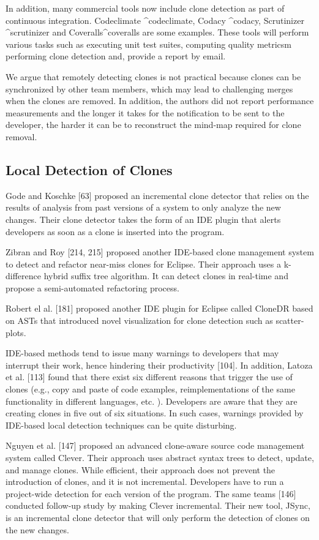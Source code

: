 \documentclass[12pt]{report}
\begin{document}
In addition, many commercial tools now include clone detection as part
of continuous integration. Codeclimate \^{}codeclimate, Codacy
\^{}codacy, Scrutinizer \^{}scrutinizer and Coveralls\^{}coveralls are
some examples. These tools will perform various tasks such as executing
unit test suites, computing quality metricsm performing clone detection
and, provide a report by email.

We argue that remotely detecting clones is not practical because clones
can be synchronized by other team members, which may lead to challenging
merges when the clones are removed. In addition, the authors did not
report performance measurements and the longer it takes for the
notification to be sent to the developer, the harder it can be to
reconstruct the mind-map required for clone removal.

\subsection{Local Detection of Clones}\label{local-detection-of-clones}

Gode and Koschke {[}63{]} proposed an incremental clone detector that
relies on the results of analysis from past versions of a system to only
analyze the new changes. Their clone detector takes the form of an IDE
plugin that alerts developers as soon as a clone is inserted into the
program.

Zibran and Roy {[}214, 215{]} proposed another IDE-based clone
management system to detect and refactor near-miss clones for Eclipse.
Their approach uses a k-difference hybrid suffix tree algorithm. It can
detect clones in real-time and propose a semi-automated refactoring
process.

Robert el al. {[}181{]} proposed another IDE plugin for Eclipse called
CloneDR based on ASTs that introduced novel visualization for clone
detection such as scatter-plots.

IDE-based methods tend to issue many warnings to developers that may
interrupt their work, hence hindering their productivity {[}104{]}. In
addition, Latoza et al. {[}113{]} found that there exist six different
reasons that trigger the use of clones (e.g., copy and paste of code
examples, reimplementations of the same functionality in different
languages, etc. ). Developers are aware that they are creating clones in
five out of six situations. In such cases, warnings provided by
IDE-based local detection techniques can be quite disturbing.

Nguyen et al. {[}147{]} proposed an advanced clone-aware source code
management system called Clever. Their approach uses abstract syntax
trees to detect, update, and manage clones. While efficient, their
approach does not prevent the introduction of clones, and it is not
incremental. Developers have to run a project-wide detection for each
version of the program. The same teams {[}146{]} conducted follow-up
study by making Clever incremental. Their new tool, JSync, is an
incremental clone detector that will only perform the detection of
clones on the new changes.
\end{document}
